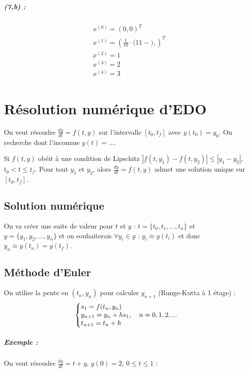 \documentclass[a4paper,9pt]{extarticle}
\newcommand{\dydt}{\frac{dy}{dt}}
\begin{document}
\paragraph*{(7,b) : }
\begin{align*}
& x^{(0)} = (0,0)^T \\
& x^{(1)} = (\frac{1}{10} \cdot \Big( 11 -  \Big),)^T \\
& x^{(2)} =  1\\
& x^{(3)} =  2\\
& x^{(4)} =  3\\
\end{align*}

\chapter{Résolution numérique d'EDO}

On veut résoudre $\dydt=f(t,y)$ sur l'intervalle $[t_0,t_f]$ avec $y(t_0)=y_0$. On recherche dont l'inconnue $y(t)=...$.

Si $f(t,y)$ obéit à une condition de Lipschitz $|f(t,y_1)-f(t,y_2)| \leq |y_1-y_2|$, $t_0 < t \leq t_f$. Pour tout $y_1$ et $y_2$, alors $\dydt=f(t,y)$ admet une solution unique sur $[t_0,t_f]$.

\section{Solution numérique}

On va créer une suite de valeur pour $t$ et $y$ : $t=\{t_0,t_1,...,t_n\}$ et $y=\{y_1,y_2,...,y_n\}$ et on souhaiterais $\forall y_i \in y$ : $y_i \approx y(t_i)$ et donc $y_n \approx y(t_n) = y(t_f)$.

\section{Méthode d'Euler}

On utilise la pente en $(t_n,y_n)$ pour calculer $y_{n+1}$ (Runge-Kutta à 1 étage) :
$$
\left\{
\begin{array}{@{}l@{}}
    s_1 = f(t_n,y_n) \\
    y_{n+1} = y_n + hs_1, \ \ \ n = 0,1,2,... \\
    t_{n+1} = t_n + h
\end{array}\right.
$$ 

\paragraph*{Exemple : } On veut résoudre $\dydt=t+y$, $y(0)=2$, $0\leq t \leq 1$ :
\end{document}
